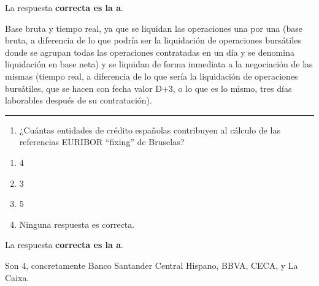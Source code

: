\documentclass[
  letterpaper,
  DIV=11,
  numbers=noendperiod]{scrreprt}
\providecommand{\tightlist}{%
  \setlength{\itemsep}{0pt}\setlength{\parskip}{0pt}}\usepackage{longtable,booktabs,array}
\begin{document}
\begin{tcolorbox}[enhanced jigsaw, left=2mm, opacityback=0, colback=white, breakable, arc=.35mm, bottomrule=.15mm, rightrule=.15mm, toprule=.15mm, leftrule=.75mm, colframe=quarto-callout-tip-color-frame]
\begin{minipage}[t]{5.5mm}
\textcolor{quarto-callout-tip-color}{\faLightbulb}
\end{minipage}%
\begin{minipage}[t]{\textwidth - 5.5mm}

La respuesta \textbf{correcta es la a}.

Base bruta y tiempo real, ya que se liquidan las operaciones una por una
(base bruta, a diferencia de lo que podría ser la liquidación de
operaciones bursátiles donde se agrupan todas las operaciones
contratadas en un día y se denomina liquidación en base neta) y se
liquidan de forma inmediata a la negociación de las mismas (tiempo real,
a diferencia de lo que sería la liquidación de operaciones bursátiles,
que se hacen con fecha valor D+3, o lo que es lo mismo, tres días
laborables después de su contratación).

\end{minipage}%
\end{tcolorbox}

\begin{center}\rule{0.5\linewidth}{0.5pt}\end{center}

\begin{enumerate}
\def\labelenumi{\arabic{enumi}.}
\setcounter{enumi}{36}
\tightlist
\item
  ¿Cuántas entidades de crédito españolas contribuyen al cálculo de las
  referencias EURIBOR ``fixing'' de Bruselas?
\end{enumerate}

\begin{enumerate}
\def\labelenumi{\alph{enumi})}
\item
  4
\item
  3
\item
  5
\item
  Ninguna respuesta es correcta.
\end{enumerate}

\begin{tcolorbox}[enhanced jigsaw, left=2mm, opacityback=0, colback=white, breakable, arc=.35mm, bottomrule=.15mm, rightrule=.15mm, toprule=.15mm, leftrule=.75mm, colframe=quarto-callout-tip-color-frame]
\begin{minipage}[t]{5.5mm}
\textcolor{quarto-callout-tip-color}{\faLightbulb}
\end{minipage}%
\begin{minipage}[t]{\textwidth - 5.5mm}

La respuesta \textbf{correcta es la a}.

Son 4, concretamente Banco Santander Central Hispano, BBVA, CECA, y La
Caixa.

\end{minipage}%
\end{tcolorbox}
\end{document}
